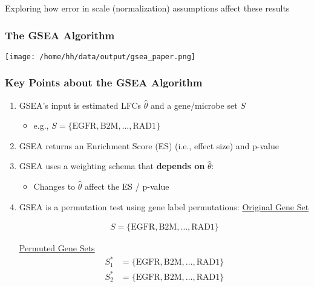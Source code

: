 \documentclass[11pt,t]{beamer}
\begin{document}
\begin{frame}
  Exploring how error in scale (normalization) assumptions affect these results
\end{frame}
  
\begin{frame}
  \frametitle{The GSEA Algorithm}
  \begin{center}
    \texttt{[image: /home/hh/data/output/gsea\_paper.png]}
  \end{center}  
\end{frame}

\begin{frame}
  \frametitle{Key Points about the GSEA Algorithm}
  \begin{enumerate}
    \item GSEA's input is estimated LFCs \(\hat{\theta}\) and a gene/microbe set \(S\)
      \begin{itemize}
        \item e.g., \(S=\{\text{EGFR},\text{B2M}, \dots, \text{RAD1}\}\)
      \end{itemize}
    \item GSEA returns an Enrichment Score (ES) (i.e., effect size) and p-value
    \item GSEA uses a weighting schema that \textbf{depends on } \(\hat{\theta}\):
      \begin{itemize}
        \item Changes to \(\hat{\theta}\) affect the ES / p-value
      \end{itemize}
    \item GSEA is a permutation test using gene label permutations:
      \underline{Original Gene Set}
      
      \begin{align*}
        S=\{\text{EGFR},\text{B2M}, \dots, \text{RAD1}\}
      \end{align*}
      
        \underline{Permuted Gene Sets}
        \begin{align*}
          S^*_1&=\{\text{EGFR},\text{B2M}, \dots, \text{RAD1}\} \\
          S^*_2&=\{\text{EGFR},\text{B2M}, \dots, \text{RAD1}\}
        \end{align*}
        
  \end{enumerate}
\end{frame}
\end{document}
